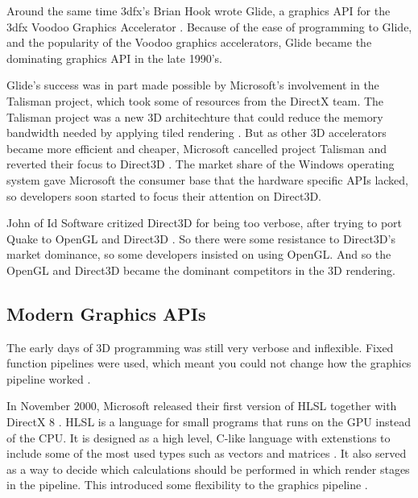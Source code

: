 Around the same time 3dfx's Brian Hook wrote Glide, a graphics API for the 3dfx Voodoo Graphics Accelerator .
Because of the ease of programming to Glide, and the popularity of the Voodoo graphics accelerators, Glide became the dominating graphics \gls{API} in the late 1990's.

Glide's success was in part made possible by Microsoft's involvement in the Talisman project, which took some of resources from the DirectX team.
The Talisman project was a new 3D architechture that could reduce the memory bandwidth needed by applying tiled rendering \cite{torborg1996talisman}.
But as other 3D accelerators became more efficient and cheaper, Microsoft cancelled project Talisman and reverted their focus to Direct3D \cite{wikipedia????talisman}.
The market share of the Windows operating system gave Microsoft the consumer base that the hardware specific \glspl{API} lacked, so developers soon started to focus their attention on Direct3D.

John \citet{carmack1996plan} of Id Software critized Direct3D for being too verbose, after trying to port Quake to OpenGL and Direct3D  .
So there were some resistance to Direct3D's market dominance, so some developers insisted on using OpenGL.
And so the OpenGL and Direct3D became the dominant competitors in the 3D rendering. 

\subsection{Modern Graphics \acs{API}s}

The early days of 3D programming was still very verbose and inflexible. 
Fixed function pipelines were used, which meant you could not change how the graphics pipeline worked \cite{davidovic2014fixedfunction}.

In November 2000, Microsoft released their first version of \gls{HLSL}  together with DirectX 8 \cite{wikipedia????directx}.
\Gls{HLSL} is a language for small programs that runs on the \gls{GPU} instead of the \gls{CPU}.
It is designed as a high level, C-like language with extenstions to include some of the most used types such as vectors and matrices \cite{microsoft????hlsl}.
It also served as a way to decide which calculations should be performed in which render stages in the pipeline.
This introduced some flexibility to the graphics pipeline .


